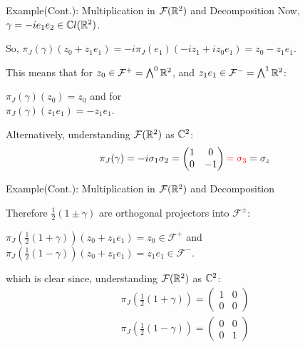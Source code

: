 \begin{frame}{Example(Cont.): Multiplication in $\mathcal F(\mathbb R^2)$ and Decomposition} %
    Now, $\gamma = -i e_1 e_2 \in \mathbb C l(\mathbb R^2)$.
    
    So, $\pi_J(\gamma) (z_0 + z_1 e_1) = -i \pi_J(e_1)(-iz_1 + iz_0e_1) = z_0 - z_1 e_1$.
    
   This means that for $z_0 \in \mathcal F ^+ = \bigwedge^0 \mathbb R^2$, and $z_1 e_1 \in \mathcal F ^- = \bigwedge^1 \mathbb R^2$:
    
    $\pi_J(\gamma)(z_0) = z_0$ \quad and for \\
    $\pi_J(\gamma)(z_1 e_1) = -z_1 e_1$.
    
    Alternatively, understanding $\mathcal F(\mathbb R^2)$ as $\mathbb C^2$:
    \begin{align}
        \pi_J(\gamma) = -i \sigma_1 \sigma_2 = \begin{pmatrix} 1 & 0 \\ 0 & -1 \end{pmatrix} \textcolor{red}{= \sigma_3} = \sigma_z
    \end{align}

\end{frame}

\begin{frame}{Example(Cont.): Multiplication in $\mathcal F(\mathbb R^2)$ and Decomposition} %
    
    Therefore $\frac{1}{2}(1 \pm \gamma)$ are orthogonal projectors into $\mathcal F^\pm$:
    
    $\pi_J(\frac{1}{2}(1+\gamma))(z_0 + z_1e_1) = z_0 \in \mathcal F^+$ \quad and\\
    $\pi_J(\frac{1}{2}(1-\gamma))(z_0 + z_1e_1) = z_1 e_1 \in \mathcal F^-$.
    
    which is clear since, understanding $\mathcal F(\mathbb R^2)$ as $\mathbb C^2$:
    \begin{align*}
        \pi_J\left(\frac{1}{2}(1+\gamma)\right) = \begin{pmatrix} 1 & 0 \\ 0 & 0 \end{pmatrix}\\
        \pi_J\left(\frac{1}{2}(1-\gamma)\right) = \begin{pmatrix} 0 & 0 \\ 0 & 1 \end{pmatrix}
    \end{align*}

\end{frame}

